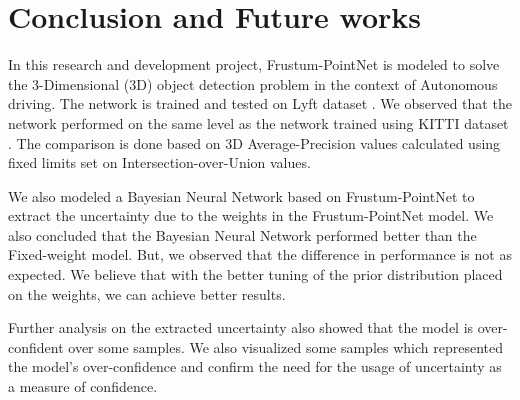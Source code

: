 \documentclass[10pt,twocolumn,letterpaper]{article}
\begin{document}
\section{Conclusion and Future works}
In this research and development project, Frustum-PointNet \cite{FPointnet2018} is modeled to solve the 3-Dimensional (3D) object detection problem in the context of Autonomous driving. The network is trained and tested on Lyft dataset \cite{Lyft2019}. We observed that the network performed on the same level as the network trained using KITTI dataset \cite{KITTI2012}. The comparison is done based on 3D Average-Precision values calculated using fixed limits set on Intersection-over-Union values.
    
We also modeled a Bayesian Neural Network based on Frustum-PointNet \cite{FPointnet2018} to extract the uncertainty due to the weights in the Frustum-PointNet \cite{FPointnet2018} model. We also concluded that the Bayesian Neural Network performed better than the Fixed-weight model. But, we observed that the difference in performance is not as expected. We believe that with the better tuning of the prior distribution placed on the weights, we can achieve better results. 

Further analysis on the extracted uncertainty also showed that the model is over-confident over some samples. We also visualized some samples which represented the model's over-confidence and confirm the need for the usage of uncertainty as a measure of confidence. 


{\small


}
\end{document}
